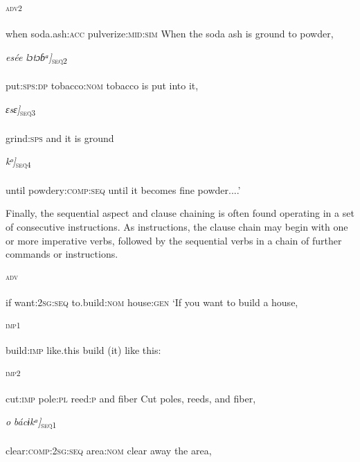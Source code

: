\ea\label{ex:}
\textsc{\textsubscript{adv2}} \\
    \\
when   soda.ash:\textsc{acc}   pulverize:\textsc{mid:sim}
\glt When the soda ash is ground to powder,
\z  


\ea\label{ex:}
\gll {[eg}\textit{esé}\textit{e   lɔtɔɓᵃ]}\textsc{\textsubscript{seq2}} \\
    \\
put:\textsc{sps:dp}   tobacco:\textsc{nom}
\glt tobacco is put into it,
\z  


\ea\label{ex:}
\gll {[ŋɔ}\textit{ɛsɛ}\textit{]}\textsc{\textsubscript{seq3}} \\
    \\
grind:\textsc{sps}
\glt and it is ground
\z  


\ea\label{ex:}
\gll {[páka ɲapúɗúmùƙòtù}\textit{kᵒ}\textit{]}\textsc{\textsubscript{seq4}} \\
    \\
until powdery:\textsc{comp:seq}
\glt until it becomes fine powder....’
\z  

Finally, the sequential aspect and clause chaining is often found operating in a set of consecutive instructions. As instructions, the clause chain may begin with one or more imperative verbs, followed by the sequential verbs in a chain of further commands or instructions.



\ea\label{ex:}
\textsc{\textsubscript{adv}} \\
    \\
if   want:\textsc{2sg:seq}   to.build:\textsc{nom}  house:\textsc{gen}
\glt ‘If you want to build a house, 
\z



\ea\label{ex:}
\gll {[bɛrɛ     tí]}\textsc{\textsubscript{imp1}} \\
    \\
build:\textsc{imp}   like.this
\glt build (it) like this:
\z  


\ea\label{ex:}
\textsc{\textsubscript{imp2}} \\
    \\
cut:\textsc{imp}   pole:\textsc{pl}   reed:\textsc{p}    and   fiber
\glt Cut poles, reeds, and fiber,
\z  


\ea\label{ex:}
\gll {[iréɲuƙoidu}\textit{o}\textit{     bácɨkᵃ]}\textsc{\textsubscript{seq1}} \\
    \\
clear:\textsc{comp:2sg:seq}   area:\textsc{nom}
\glt clear away the area,
\z  



